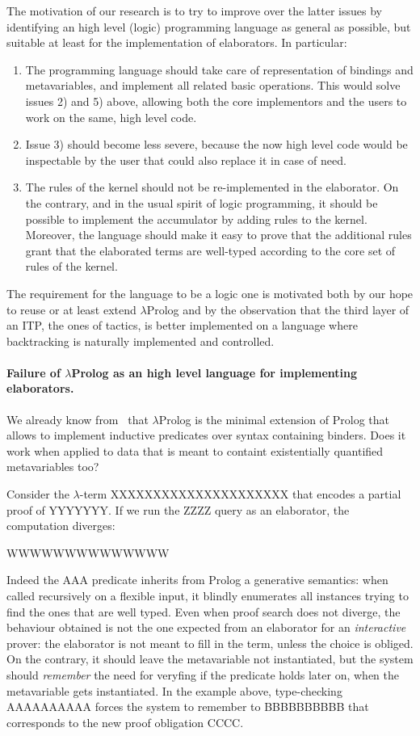 \documentclass{easychair}
\begin{document}
The motivation of our research is to try to improve over the latter issues by identifying an high level (logic) programming language as general as possible, but suitable at least for the implementation of elaborators. In particular:
\begin{enumerate}
\item The programming language should take care of representation of bindings and metavariables, and implement all related basic operations. This would solve issues 2) and 5) above, allowing both the core implementors and the users to work on the same, high level code.
\item Issue 3) should become less severe, because the now high level code would be inspectable by the user that could also replace it in case of need.
\item The rules of the kernel should not be re-implemented in the elaborator. On the contrary, and in the usual spirit of logic programming, it should be possible to implement the accumulator by adding rules to the kernel. Moreover, the language should make it easy to prove that the additional rules grant that the elaborated terms are well-typed according to the core set of rules of the kernel.
\end{enumerate}

The requirement for the language to be a logic one is motivated both by our hope to reuse or at least extend $\lambda$Prolog and by the observation that the third layer of an ITP, the ones of tactics, is better implemented on a language where backtracking is naturally implemented and controlled.

\paragraph{Failure of $\lambda$Prolog as an high level language for implementing elaborators.}
We already know from~\cite{jlp98} that $\lambda$Prolog is the minimal extension of Prolog that allows to implement inductive predicates over syntax containing binders. Does it work when applied to data that is meant to containt existentially quantified metavariables too?

Consider the $\lambda$-term XXXXXXXXXXXXXXXXXXXXX that encodes a partial proof of YYYYYYY. If we run the ZZZZ query as an elaborator, the computation diverges:

WWWWWWWWWWWWWW

Indeed the AAA predicate inherits from Prolog a generative semantics: when called recursively on a flexible input, it blindly enumerates all instances trying to find the ones that are well typed. Even when proof search does not diverge, the behaviour obtained is not the one expected from an elaborator for an \emph{interactive} prover: the elaborator is not meant to fill in the term, unless the choice is obliged. On the contrary, it should leave the metavariable not instantiated, but the system should \emph{remember} the need for veryfing if the predicate holds later on, when the metavariable gets instantiated. In the example above, type-checking AAAAAAAAAA forces the system to remember to BBBBBBBBBB that corresponds to the new proof obligation CCCC.
\end{document}
